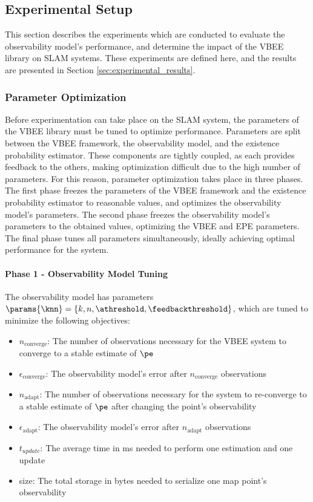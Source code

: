 \subsection{Experimental Setup}

This section describes the experiments which are conducted to evaluate the observability model's performance, and determine the impact of the VBEE library on SLAM systems. These experiments are defined here, and the results are presented in Section \ref{sec:experimental_results}.

\subsubsection{Parameter Optimization}

Before experimentation can take place on the SLAM system, the parameters of the VBEE library must be tuned to optimize performance. Parameters are split between the VBEE framework, the observability model, and the existence probability estimator.  These components are tightly coupled, as each provides feedback to the others, making optimization difficult due to the high number of parameters. For this reason, parameter optimization takes place in three phases. The first phase freezes the parameters of the VBEE framework and the existence probability estimator to reasonable values, and optimizes the observability model's parameters. The second phase freezes the observability model's parameters to the obtained values, optimizing the VBEE and EPE parameters. The final phase tunes all parameters simultaneously, ideally achieving optimal performance for the system.

\paragraph{Phase 1 - Observability Model Tuning}

The observability model has parameters $\params{\knn} = \{k, n, \athreshold, \feedbackthreshold\}$, which are tuned to minimize the following objectives:
\begin{itemize}
    \item $n_{\text{converge}}$: The number of observations necessary for the VBEE system to converge to a stable estimate of $\pe$
    \item $\epsilon_{\text{converge}}$: The observability model's error after $n_{\text{converge}}$ observations
    \item $n_{\text{adapt}}$: The number of observations necessary for the system to re-converge to a stable estimate of $\pe$ after changing the point's observability
    \item $\epsilon_{\text{adapt}}$: The observability model's error after $n_{\text{adapt}}$ observations
    \item $t_{update}$: The average time in ms needed to perform one estimation and one update
    \item size: The total storage in bytes needed to serialize one map point's observability
\end{itemize}

